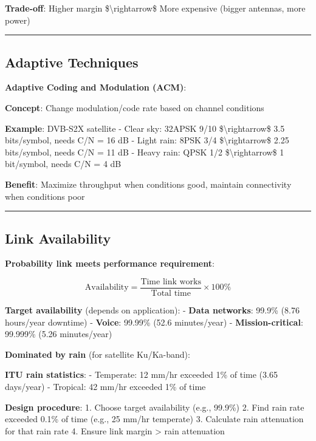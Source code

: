\textbf{Trade-off}: Higher margin \$\textbackslash rightarrow\$ More
expensive (bigger antennas, more power)

\begin{center}\rule{0.5\linewidth}{0.5pt}\end{center}

\subsection{Adaptive Techniques}\label{adaptive-techniques}

\textbf{Adaptive Coding and Modulation (ACM)}:

\textbf{Concept}: Change modulation/code rate based on channel
conditions

\textbf{Example}: DVB-S2X satellite - Clear sky: 32APSK 9/10
\$\textbackslash rightarrow\$ 3.5 bits/symbol, needs C/N = 16 dB - Light
rain: 8PSK 3/4 \$\textbackslash rightarrow\$ 2.25 bits/symbol, needs C/N
= 11 dB - Heavy rain: QPSK 1/2 \$\textbackslash rightarrow\$ 1
bit/symbol, needs C/N = 4 dB

\textbf{Benefit}: Maximize throughput when conditions good, maintain
connectivity when conditions poor

\begin{center}\rule{0.5\linewidth}{0.5pt}\end{center}

\subsection{Link Availability}\label{link-availability}

\textbf{Probability link meets performance requirement}:

\[
\text{Availability} = \frac{\text{Time link works}}{\text{Total time}} \times 100\%
\]

\textbf{Target availability} (depends on application): - \textbf{Data
networks}: 99.9\% (8.76 hours/year downtime) - \textbf{Voice}: 99.99\%
(52.6 minutes/year) - \textbf{Mission-critical}: 99.999\% (5.26
minutes/year)

\textbf{Dominated by rain} (for satellite Ku/Ka-band):

\textbf{ITU rain statistics}: - Temperate: 12 mm/hr exceeded 1\% of time
(3.65 days/year) - Tropical: 42 mm/hr exceeded 1\% of time

\textbf{Design procedure}: 1. Choose target availability (e.g., 99.9\%)
2. Find rain rate exceeded 0.1\% of time (e.g., 25 mm/hr temperate) 3.
Calculate rain attenuation for that rain rate 4. Ensure link margin
\textgreater{} rain attenuation

